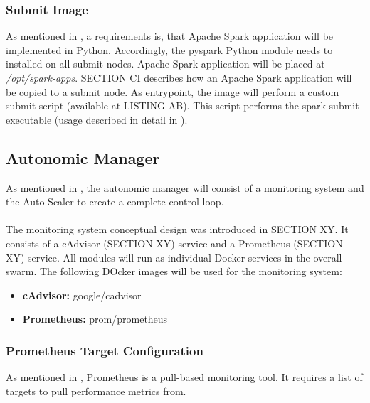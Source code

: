 \subsubsection{Submit Image}
As mentioned in , a requirements is, that Apache Spark application will be implemented in Python. Accordingly, the pyspark Python module needs to installed on all submit nodes.
Apache Spark application will be placed at \textit{/opt/spark-apps}. SECTION CI describes how an Apache Spark application will be copied to a submit node.
As entrypoint, the image will perform a custom submit script (available at LISTING AB). This script performs the spark-submit executable (usage described in detail in ).


\subsection{Autonomic Manager}
As mentioned in , the autonomic manager will consist of a monitoring system and the Auto-Scaler to create a complete control loop.

\paragraph{}The monitoring system conceptual design was introduced in SECTION XY.
It consists of a cAdvisor (SECTION XY) service and a Prometheus (SECTION XY) service.
All modules will run as individual Docker services in the overall swarm.
The following DOcker images will be used for the monitoring system:
\begin{itemize}
\item \textbf{cAdvisor:} google/cadvisor
\item \textbf{Prometheus:} prom/prometheus
\end{itemize}

\subsubsection{Prometheus Target Configuration}




As mentioned in , Prometheus is a pull-based monitoring tool.
It requires a list of targets to pull performance metrics from.


